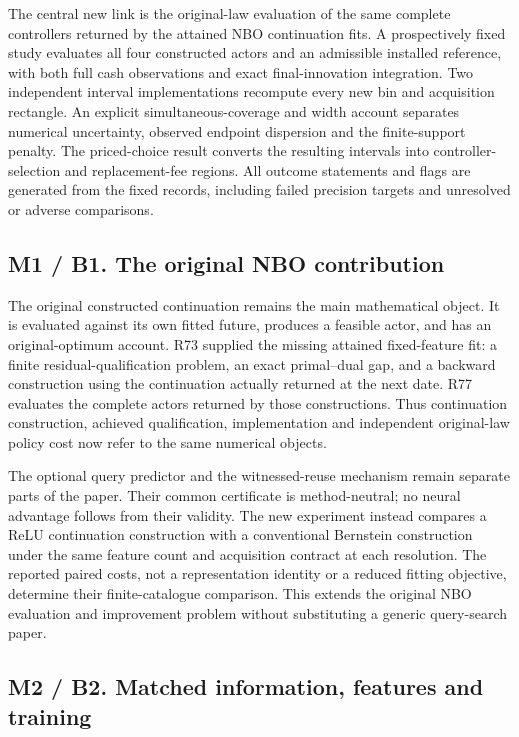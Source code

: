 \documentclass[ecta,nameyear,draft]{econsocart}
\begin{document}
The central new link is the original-law evaluation of the same complete
controllers returned by the attained NBO continuation fits. A
prospectively fixed study evaluates all four constructed actors and an
admissible installed reference, with both full cash observations and
exact final-innovation integration. Two independent interval
implementations recompute every new bin and acquisition rectangle. An
explicit simultaneous-coverage and width account separates numerical
uncertainty, observed endpoint dispersion and the finite-support
penalty. The priced-choice result converts the resulting intervals into
controller-selection and replacement-fee regions. All outcome statements
and flags are generated from the fixed records, including failed
precision targets and unresolved or adverse comparisons.

\hypertarget{m1-b1.-the-original-nbo-contribution}{%
\subsection{M1 / B1. The original NBO
contribution}\label{m1-b1.-the-original-nbo-contribution}}

The original constructed continuation remains the main mathematical
object. It is evaluated against its own fitted future, produces a
feasible actor, and has an original-optimum account. R73 supplied the
missing attained fixed-feature fit: a finite residual-qualification
problem, an exact primal--dual gap, and a backward construction using
the continuation actually returned at the next date. R77 evaluates the
complete actors returned by those constructions. Thus continuation
construction, achieved qualification, implementation and independent
original-law policy cost now refer to the same numerical objects.

The optional query predictor and the witnessed-reuse mechanism remain
separate parts of the paper. Their common certificate is method-neutral;
no neural advantage follows from their validity. The new experiment
instead compares a ReLU continuation construction with a conventional
Bernstein construction under the same feature count and acquisition
contract at each resolution. The reported paired costs, not a
representation identity or a reduced fitting objective, determine their
finite-catalogue comparison. This extends the original NBO evaluation
and improvement problem without substituting a generic query-search
paper.

\hypertarget{m2-b2.-matched-information-features-and-training}{%
\subsection{M2 / B2. Matched information, features and
training}\label{m2-b2.-matched-information-features-and-training}}
\end{document}

